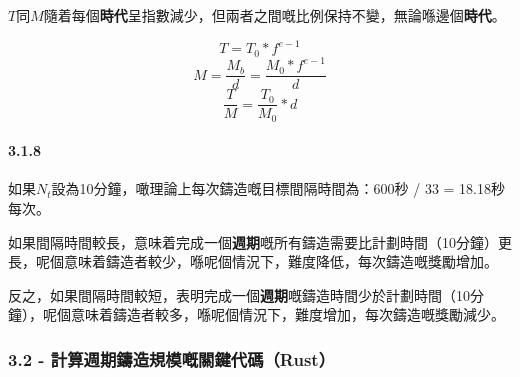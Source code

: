 \documentclass[
]{article}
\begin{document}
\(T\)同\(M\)隨着每個\textbf{時代}呈指數減少，但兩者之間嘅比例保持不變，無論喺邊個\textbf{時代}。

\begin{equation}
T=T_0*f^{e-1}
\end{equation} \begin{equation}
M = \frac{M_b}{d}=\frac{M_0 * f^{e-1}}{d}
\end{equation} \begin{equation}
\frac{T}{M} = \frac{T_0}{M_0} * d
\end{equation}

\paragraph{3.1.8}\label{section-2}

如果\(N_t\)設為10分鐘，噉理論上每次鑄造嘅目標間隔時間為：600秒 / 33 =
18.18秒每次。

如果間隔時間較長，意味着完成一個\textbf{週期}嘅所有鑄造需要比計劃時間（10分鐘）更長，呢個意味着鑄造者較少，喺呢個情況下，難度降低，每次鑄造嘅獎勵增加。

反之，如果間隔時間較短，表明完成一個\textbf{週期}嘅鑄造時間少於計劃時間（10分鐘），呢個意味着鑄造者較多，喺呢個情況下，難度增加，每次鑄造嘅獎勵減少。

\subsubsection{3.2 -
計算週期鑄造規模嘅關鍵代碼（Rust）}\label{ux8a08ux7b97ux9031ux671fux9444ux9020ux898fux6a21ux5605ux95dcux9375ux4ee3ux78bcrust}
\end{document}
